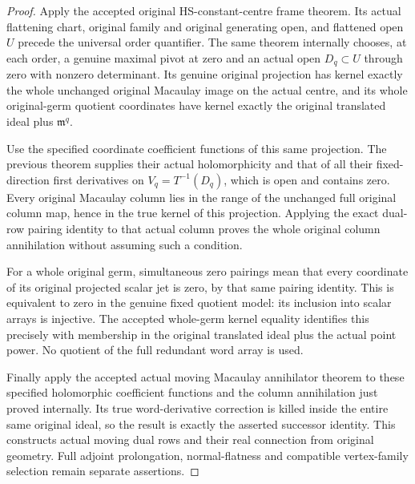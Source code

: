 \begin{proof}
Apply the accepted original HS-constant-centre frame theorem. Its
actual flattening chart, original family and original generating open,
and flattened open $U$ precede the universal order quantifier. The
same theorem internally chooses, at each order, a genuine maximal
pivot at zero and an actual open $D_q\subset U$ through zero with
nonzero determinant. Its genuine original projection has kernel
exactly the whole unchanged original Macaulay image on the actual
centre, and its whole original-germ quotient coordinates have kernel
exactly the original translated ideal plus $\mathfrak m^q$.

Use the specified coordinate coefficient functions of this same
projection. The previous theorem supplies their actual holomorphicity
and that of all their fixed-direction first derivatives on
$V_q=T^{-1}(D_q)$, which is open and contains zero. Every original
Macaulay column lies in the range of the unchanged full original
column map, hence in the true kernel of this projection. Applying
the exact dual-row pairing identity to that actual column proves the
whole original column annihilation without assuming such a condition.

For a whole original germ, simultaneous zero pairings mean that every
coordinate of its original projected scalar jet is zero, by that
same pairing identity. This is equivalent to zero in the genuine
fixed quotient model: its inclusion into scalar arrays is injective.
The accepted whole-germ kernel equality identifies this precisely
with membership in the original translated ideal plus the actual
point power. No quotient of the full redundant word array is used.

Finally apply the accepted actual moving Macaulay annihilator theorem
to these specified holomorphic coefficient functions and the column
annihilation just proved internally. Its true word-derivative
correction is killed inside the entire same original ideal, so the
result is exactly the asserted successor identity. This constructs
actual moving dual rows and their real connection from original
geometry. Full adjoint prolongation, normal-flatness and compatible
vertex-family selection remain separate assertions.
\end{proof}
